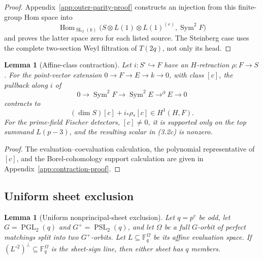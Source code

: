 \documentclass[11pt]{article}
\newtheorem{lemma}[theorem]{Lemma}
\theoremstyle{definition}
\theoremstyle{remark}
\newcommand{\F}{\mathbb{F}}
\begin{document}
\begin{proof}
Appendix~\ref{app:outer-parity-proof} constructs an injection from this
finite-group Hom space into
\[
 \operatorname{Hom}_{\operatorname{SL}_2(k)}
 \bigl(S\otimes L(1)\otimes L(1)^{(e)},\operatorname{Sym}^2F\bigr)
\]
and proves the latter space zero for each listed source.  The Steinberg
case uses the complete two-section Weyl filtration of \(T(2q)\), not only
its head.
\end{proof}

\begin{lemma}[Affine-class contraction]
\label{lem:affine-class-contraction}
Let \(i:S^\square\hookrightarrow F\) have an \(H\)-retraction
\(\rho:F\to S\).  For the point-vector extension
\(0\to F\to E\to k\to0\), with class \([c]\), the pullback along \(i\)
of
\[
 0\longrightarrow\operatorname{Sym}^2F
 \longrightarrow\operatorname{Sym}^2E
 \mathrel{\mathop{\longrightarrow}^{\partial}}E
 \longrightarrow0
\]
contracts to
\[
 (\dim S)[c]+i_*\rho_*[c]\in H^1(H,F).                 \tag{3.2c}
\]
For the prime-field Fischer detectors, \([c]\ne0\), it is supported only
on the top summand \(L(p-3)\), and the resulting scalar in (3.2c) is
nonzero.
\end{lemma}

\begin{proof}
The evaluation--coevaluation calculation, the polynomial representative
of \([c]\), and the Borel-cohomology support calculation are given in
Appendix~\ref{app:contraction-proof}.
\end{proof}

\subsection{Uniform sheet exclusion}

\begin{lemma}[Uniform nonprincipal-sheet exclusion]
\label{lem:uniform-sheet-exclusion}
Let \(q=p^e\) be odd, let \(G=\operatorname{PGL}_2(q)\) and
\(G^+=\operatorname{PSL}_2(q)\), and let \(\Omega\) be a full
\(G\)-orbit of perfect
matchings split into two \(G^+\)-orbits.  Let
\(L\subseteq\F_q^\Omega\) be its affine evaluation space.  If
\((L^{\circ2})^\perp\subseteq\F_q^\Omega\) is the sheet-sign line,
then either sheet has \(q\) members.
\end{lemma}
\end{document}
